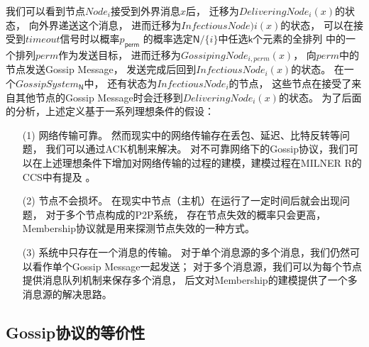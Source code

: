 我们可以看到节点$Node_i$接受到外界消息$x$后，
迁移为$DeliveringNode_i(x)$的状态，
向外界递送这个消息，
进而迁移为$InfectiousNode)i(x)$的状态，
可以在接受到$timeout$信号时以概率$p_{\mathsf{perm}}$
的概率选定$\mathsf{N}/\{i\}$中任选$\mathsf{k}$个元素的全排列
中的一个排列$perm$作为发送目标，
进而迁移为$GossipingNode_{i,perm}(x)$，
向$perm$中的节点发送Gossip Message，
发送完成后回到$InfectiousNode_i(x)$的状态。
在一个$GossipSystem_{\mathsf{N}}$中，
还有状态为$InfectiousNode_i$的节点，
这些节点在接受了来自其他节点的Gossip Message时会迁移到$DeliveringNode_i(x)$的状态。
为了后面的分析，上述定义基于一系列理想条件的假设：
\begin{itemize}
   \item [(1)] {网络传输可靠。
   然而现实中的网络传输存在丢包、延迟、比特反转等问题，
   我们可以通过ACK机制来解决。
   对不可靠网络下的Gossip协议，我们可以在上述理想条件下增加对网络传输的过程的建模，建模过程在MILNER R的CCS中有提及
   \cite{Milner_CCS}。
   }
   \item [(2)] {节点不会损坏。
   在现实中节点（主机）在运行了一定时间后就会出现问题，
   对于多个节点构成的P2P系统，
   存在节点失效的概率只会更高\cite{MTTF}，
   Membership协议就是用来探测节点失效的一种方式。
   }
   \item [(3)] {
      系统中只存在一个消息的传输。
      对于单个消息源的多个消息，我们仍然可以看作单个Gossip Message一起发送；
      对于多个消息源，我们可以为每个节点提供消息队列机制来保存多个消息，
      后文对Membership的建模提供了一个多消息源的解决思路。
      }
\end{itemize}

\subsection{Gossip协议的等价性}

